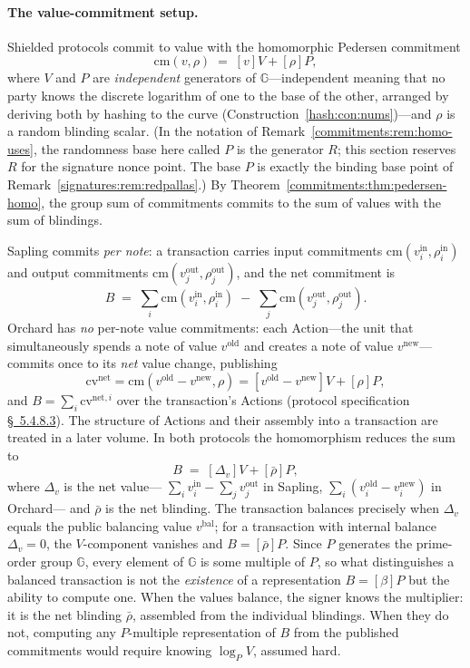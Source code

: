 \documentclass[11pt,a4paper]{article}
\theoremstyle{definition}
\theoremstyle{remark}
\newcommand{\G}{\ensuremath{\mathbb{G}}}
\begin{document}
\paragraph{The value-commitment setup.}
Shielded protocols commit to value with the homomorphic Pedersen
commitment
\[
\mathrm{cm}(v, \rho) \;=\; [v]V + [\rho]P,
\]
where \(V\) and \(P\) are \emph{independent} generators of
\(\G\)---independent meaning that no party knows the discrete
logarithm of one to the base of the other, arranged by deriving both
by hashing to the curve (Construction~\ref{hash:con:nums})---and
\(\rho\) is a random blinding scalar. (In the notation of
Remark~\ref{commitments:rem:homo-uses}, the randomness base here
called \(P\) is the generator \(R\); this section reserves \(R\) for
the signature nonce point. The base \(P\) is exactly the binding
base point of Remark~\ref{signatures:rem:redpallas}.) By
Theorem~\ref{commitments:thm:pedersen-homo}, the group sum of
commitments commits to the sum of values with the sum of blindings.

Sapling commits \emph{per note}: a transaction carries input
commitments \(\mathrm{cm}(v^{\mathrm{in}}_i, \rho^{\mathrm{in}}_i)\)
and output commitments
\(\mathrm{cm}(v^{\mathrm{out}}_j, \rho^{\mathrm{out}}_j)\), and the
net commitment is
\[
B \;=\; \sum_i \mathrm{cm}(v^{\mathrm{in}}_i, \rho^{\mathrm{in}}_i)
   \;-\; \sum_j \mathrm{cm}(v^{\mathrm{out}}_j,
                            \rho^{\mathrm{out}}_j).
\]
Orchard has \emph{no} per-note value commitments: each Action---the
unit that simultaneously spends a note of value \(v^{\mathrm{old}}\)
and creates a note of value \(v^{\mathrm{new}}\)---commits once to
its \emph{net} value change, publishing
\[
\mathrm{cv}^{\mathrm{net}}
= \mathrm{cm}(v^{\mathrm{old}} - v^{\mathrm{new}}, \rho)
= [v^{\mathrm{old}} - v^{\mathrm{new}}]V + [\rho]P,
\]
and \(B = \sum_i \mathrm{cv}^{\mathrm{net},i}\) over the
transaction's Actions (protocol specification \href{https://zips.z.cash/protocol/protocol.pdf\#concretehomomorphiccommit}{\S~5.4.8.3}). The
structure of Actions and their assembly into a transaction are
treated in a later volume.
In both protocols the homomorphism reduces the sum to
\[
B \;=\; [\Delta_v]V + [\bar\rho]P,
\]
where \(\Delta_v\) is the net value---
\(\sum_i v^{\mathrm{in}}_i - \sum_j v^{\mathrm{out}}_j\) in Sapling,
\(\sum_i (v^{\mathrm{old}}_i - v^{\mathrm{new}}_i)\) in Orchard---
and \(\bar\rho\) is the net blinding. The transaction balances
precisely when \(\Delta_v\) equals the public balancing value
\(v^{\mathrm{bal}}\); for a transaction with internal balance
\(\Delta_v = 0\), the \(V\)-component vanishes and
\(B = [\bar\rho]P\). Since \(P\) generates the prime-order group
\(\G\), every element of \(\G\) is some multiple of \(P\), so what
distinguishes a balanced
transaction is not the \emph{existence} of a representation
\(B = [\beta]P\) but the ability to compute one. When the values
balance, the signer knows the multiplier: it is the net blinding
\(\bar\rho\), assembled from the individual blindings. When they do
not, computing any \(P\)-multiple representation of \(B\) from the
published commitments would require knowing \(\log_P V\), assumed
hard.
\end{document}
